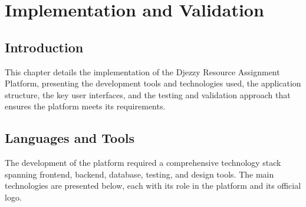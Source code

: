 \documentclass{bts-report}
\begin{document}
\chapter{Implementation and Validation}

\section*{Introduction}
This chapter details the implementation of the Djezzy Resource Assignment Platform, presenting the development tools and technologies used, the application structure, the key user interfaces, and the testing and validation approach that ensures the platform meets its requirements.

\section{Languages and Tools}

The development of the platform required a comprehensive technology stack spanning frontend, backend, database, testing, and design tools. The main technologies are presented below, each with its role in the platform and its official logo.
\end{document}
